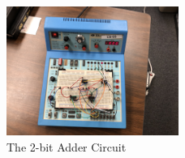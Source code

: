 \documentclass[11pt]{article}
\begin{document}
	\begin{figure}[ht]\centering
		\includegraphics[width=0.5\textwidth]{2-bitAdder}
		\caption{The 2-bit Adder Circuit}
		\label{fig:2-bitAdder}
	\end{figure}
\end{document}
